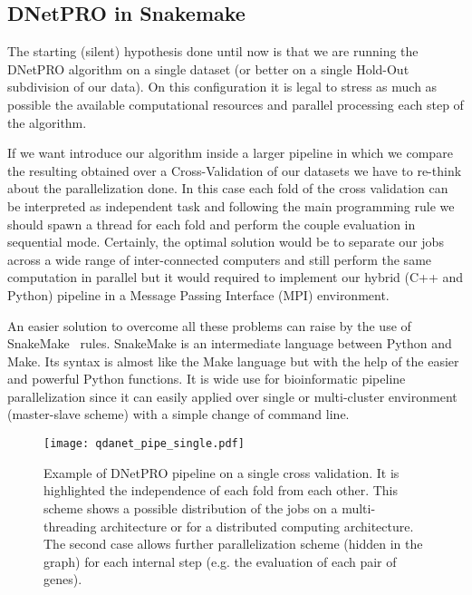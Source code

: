 \documentclass{standalone}
\begin{document}
\subsection[Pipeline]{DNetPRO in Snakemake}\label{implementation:snakemake}

The starting (silent) hypothesis done until now is that we are running the DNetPRO algorithm on a single dataset (or better on a single Hold-Out subdivision of our data).
On this configuration it is legal to stress as much as possible the available computational resources and parallel processing each step of the algorithm.

If we want introduce our algorithm inside a larger pipeline in which we compare the resulting obtained over a Cross-Validation of our datasets we have to re-think about the parallelization done.
In this case each fold of the cross validation can be interpreted as independent task and following the main programming rule \emph{} we should spawn a thread for each fold and perform the couple evaluation in sequential mode.
Certainly, the optimal solution would be to separate our jobs across a wide range of inter-connected computers and still perform the same computation in parallel but it would required to implement our hybrid (C++ and Python) pipeline in a Message Passing Interface (MPI) environment.

An easier solution to overcome all these problems can raise by the use of SnakeMake~\cite{snakemake} rules.
SnakeMake is an intermediate language between Python and Make.
Its syntax is almost like the Make language but with the help of the easier and powerful Python functions.
It is wide use for bioinformatic pipeline parallelization since it can easily applied over single or multi-cluster environment (master-slave scheme) with a simple change of command line.

\begin{center}
\begin{figure}[htbp]
\centering
\texttt{[image: qdanet\_pipe\_single.pdf]}
\caption{Example of DNetPRO pipeline on a single cross validation.
It is highlighted the independence of each fold from each other.
This scheme shows a possible distribution of the jobs on a multi-threading architecture or for a distributed computing architecture.
The second case allows further parallelization scheme (hidden in the graph) for each internal step (e.g. the evaluation of each pair of genes).
}
\label{fig:dnet_workflow}
\end{figure}
\end{center}
\end{document}
